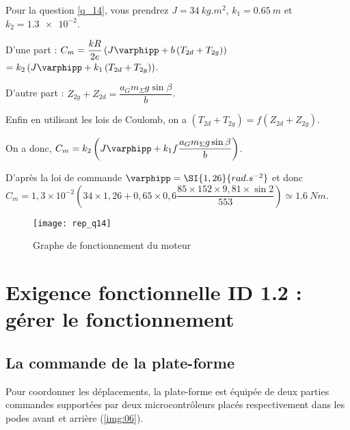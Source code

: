 Pour la question \ref{q_14}, vous prendrez $J =\SI{34}{kg.m^2}$, $k_1 =\SI{0,65}{m}$ et $k_2 = \num{1,3e-2}$.

\ifprof
\begin{corrige}
D'une part : $  C_m  =\dfrac{kR}{2e} \left(J\varphipp  +b\left( T_{2d} +T_{2g} \right)\right) $ 
$=k_2 \left(J\varphipp  +k_1\left( T_{2d} +T_{2g} \right)\right) $.

D'autre part : $Z_{2g}+ Z_{2d}= \dfrac{ a_G  m_\Sigma g \sin \beta  }{b} $.

Enfin en utilisant les lois de Coulomb, on a $\left( T_{2d} +T_{2g} \right) = f\left( Z_{2d} +Z_{2g} \right)$.

On a donc, $  C_m  =k_2 \left(J\varphipp  +k_1f\dfrac{ a_G  m_\Sigma g \sin \beta  }{b}\right) $.

D'après la loi de commande $\varphipp = \SI{1,26}{rad.s^{-2}}$
et donc $C_m = 1,3\times 10^{-2}\left(34\times 1,26 + 0,65 \times 0,6 \dfrac{ 85 \times 152 \times  9,81 \times  \sin 2 }{553}\right) \simeq \SI{1,6}{Nm}$.

\end{corrige}
\else
\fi

\begin{figure}[H]
\centering
\texttt{[image: rep\_q14]}
\caption{Graphe de fonctionnement du moteur\label{rep_q14}}
\end{figure}



\section{Exigence fonctionnelle ID 1.2 : gérer le fonctionnement}
\subsection{La commande de la plate-forme}

\ifprof
\else

Pour coordonner les déplacements, la plate-forme est équipée de deux parties commandes supportées par deux microcontrôleurs placés respectivement dans les podes avant et arrière (\autoref{img:06}).

